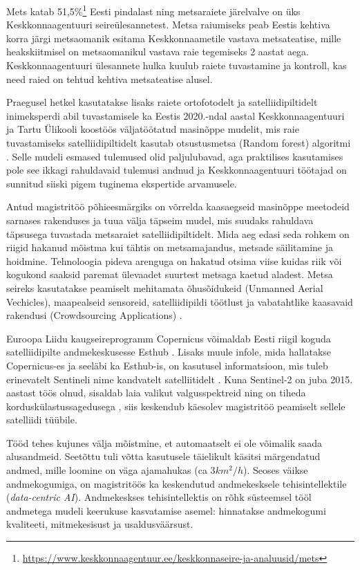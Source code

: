 Mets katab 51,5\%\footnote{\url{https://www.keskkonnaagentuur.ee/keskkonnaseire-ja-analuusid/mets}} Eesti pindalast ning metsaraiete järelvalve on üks Keskkonnaagentuuri seireülesannetest. Metsa raiumiseks peab Eestis kehtiva korra järgi metsaomanik esitama Keskkonnaametile vastava metsateatise, mille heakskiitmisel on metsaomanikul vastava raie tegemiseks 2 aastat aega. Keskkonnaagentuuri ülesannete hulka kuulub raiete tuvastamine ja kontroll, kas need raied on tehtud kehtiva metsateatise alusel.  

Praegusel hetkel kasutatakse lisaks raiete ortofotodelt ja satelliidipiltidelt inimeksperdi abil tuvastamisele ka Eestis 2020.-ndal aastal Keskkonnaagentuuri ja Tartu Ülikooli koostöös väljatöötatud masinõppe mudelit, mis raie tuvastamiseks satelliidipiltidelt kasutab otsustusmetsa (Random forest) algoritmi \cite{TartuUlikooliTeadlased2020}. Selle mudeli esmased tulemused olid paljulubavad, aga praktilises kasutamises pole see ikkagi rahuldavaid tulemusi andnud ja Keskkonnaagentuuri töötajad on sunnitud siiski pigem tuginema ekspertide arvamusele.

Antud magistritöö põhieesmärgiks on võrrelda kaasaegseid masinõppe meetodeid sarnases rakenduses ja tuua välja täpseim mudel, mis suudaks rahuldava täpsusega tuvastada metsaraiet satelliidipiltidelt. Mida aeg edasi seda rohkem on riigid hakanud mõistma kui tähtis on metsamajandus, metsade säilitamine ja hoidmine. Tehnoloogia pideva arenguga on hakatud otsima viise kuidas riik või kogukond saaksid paremat ülevaadet suurtest metsaga kaetud aladest. Metsa seireks kasutatakse peamiselt mehitamata õhusõidukeid (Unmanned Aerial Vechicles), maapealseid sensoreid, satelliidipildi töötlust ja vabatahtlike kaasavaid rakendusi (Crowdsourcing Applications) \cite{cheungPerimeterDefense42015}.

Euroopa Liidu kaugseireprogramm Copernicus võimaldab Eesti riigil koguda satelliidipilte andmekeskusesse Esthub \cite{maa-ametRiiklikSatelliidiandmeteKeskus}. Lisaks muule infole, mida hallatakse Copernicus-es ja seeläbi ka Esthub-is, on kasutusel informatsioon, mis tuleb erinevatelt Sentineli nime kandvatelt satelliitidelt \cite{InfrastructureOverviewCopernicus}. Kuna Sentinel-2 on juba 2015. aastast töös olnud, sisaldab laia valikut valgusspektreid ning on tiheda korduskülastussagedusega \cite{Sentinel2OverviewScienceDirect}, siis keskendub käesolev magistritöö peamiselt sellele satelliidi tüübile.

Tööd tehes kujunes välja mõistmine, et automaatselt ei ole võimalik saada alusandmeid. Seetõttu tuli võtta kasutusele täielikult käsitsi märgendatud andmed, mille loomine on väga ajamahukas (ca 3$km^2/h$). Seoses väikse andmekogumiga, on magistritöös ka keskendutud andmekesksele tehisintellektile (\textit{data-centric AI}). Andmekeskses tehisintellektis on rõhk süsteemsel tööl andmetega mudeli keerukuse kasvatamise asemel: hinnatakse andmekogumi kvaliteeti, mitmekesisust ja usaldusväärsust.

